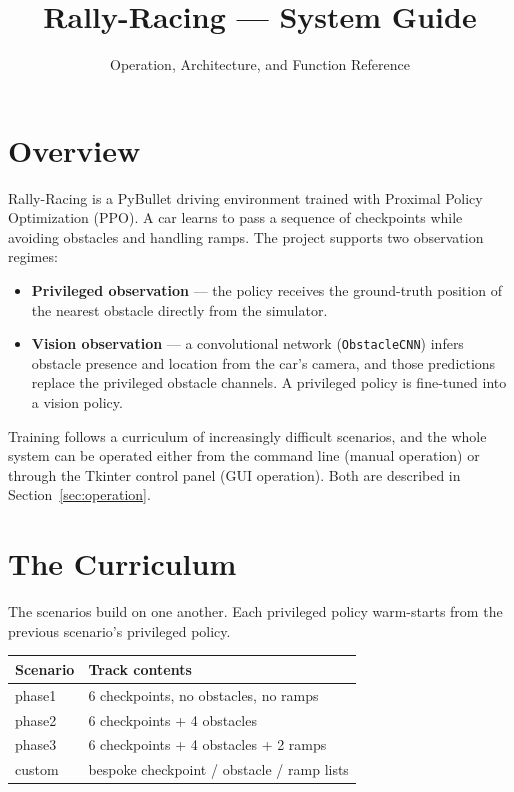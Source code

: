 \documentclass[11pt]{article}
\title{Rally-Racing --- System Guide}
\author{Operation, Architecture, and Function Reference}
\date{}
\begin{document}
\maketitle

\tableofcontents

\section{Overview}

Rally-Racing is a PyBullet driving environment trained with Proximal Policy
Optimization (PPO). A car learns to pass a sequence of checkpoints while
avoiding obstacles and handling ramps. The project supports two observation
regimes:

\begin{itemize}
  \item \textbf{Privileged observation} --- the policy receives the
        ground-truth position of the nearest obstacle directly from the
        simulator.
  \item \textbf{Vision observation} --- a convolutional network
        (\texttt{ObstacleCNN}) infers obstacle presence and location from the
        car's camera, and those predictions replace the privileged obstacle
        channels. A privileged policy is fine-tuned into a vision policy.
\end{itemize}

Training follows a curriculum of increasingly difficult scenarios, and the
whole system can be operated either from the command line (manual operation)
or through the Tkinter control panel (GUI operation). Both are described in
Section~\ref{sec:operation}.

\section{The Curriculum}

The scenarios build on one another. Each privileged policy warm-starts from
the previous scenario's privileged policy.

\begin{center}
\begin{tabular}{ll}
\textbf{Scenario} & \textbf{Track contents} \\
\hline
phase1 & 6 checkpoints, no obstacles, no ramps \\
phase2 & 6 checkpoints + 4 obstacles \\
phase3 & 6 checkpoints + 4 obstacles + 2 ramps \\
custom & bespoke checkpoint / obstacle / ramp lists \\
\end{tabular}
\end{center}
\end{document}
